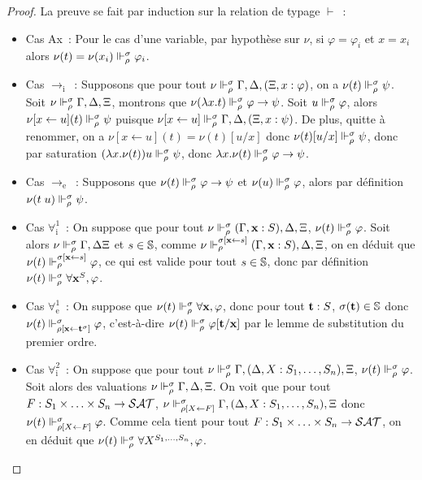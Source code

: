 \documentclass{article}
\begin{document}
\begin{proof}
  La preuve se fait par induction sur la relation de typage $\vdash$~:
  \begin{itemize}
  \item Cas Ax~: Pour le cas d'une variable, par hypothèse sur $\nu$, si $\varphi = \varphi_i$ et $x = x_i$ alors $\nu(t) = \nu(x_i)\Vdash_\rho^\sigma \varphi_i$.
  \item Cas $\to_\mathrm i$~: Supposons que pour tout $\nu \Vdash_\rho^\sigma \Gamma,\Delta,(\Xi, x : \varphi)$, on a $\nu(t) \Vdash_\rho^\sigma \psi$. Soit $\nu \Vdash_\rho^\sigma \Gamma,\Delta,\Xi$, montrons que $\nu(\lambda x.t)\Vdash_\rho^\sigma \varphi \to \psi$. Soit $u \Vdash_\rho^\sigma \varphi$, alors $\nu[x \leftarrow u](t)\Vdash_\rho^\sigma \psi$ puisque $\nu[x\leftarrow u]\Vdash_\rho^\sigma \Gamma,\Delta,(\Xi, x : \psi)$. De plus, quitte à renommer, on a $\nu[x\leftarrow u](t) = \nu(t)[u/x]$ donc $\nu(t)[u/x]\Vdash_\rho^\sigma \psi$, donc par saturation $(\lambda x.\nu(t)) u \Vdash_\rho^\sigma \psi$, donc $\lambda x.\nu(t)\Vdash_\rho^\sigma \varphi\to\psi$.
  \item Cas $\to_\mathrm e$~: Supposons que $\nu(t)\Vdash_\rho^\sigma \varphi \to \psi$ et $\nu(u)\Vdash_\rho^\sigma \varphi$, alors par définition $\nu(t\;u)\Vdash_\rho^\sigma \psi$.
  \item Cas $\forall_\mathrm i^1$~: On suppose que pour tout $\nu\Vdash_\rho^\sigma (\Gamma, \mathbf{x} : S),\Delta,\Xi$, $\nu(t)\Vdash_\rho^\sigma \varphi$. Soit alors $\nu\Vdash_\rho^\sigma \Gamma,\Delta\Xi$ et $s \in \mathbb{S}$, comme $\nu\Vdash_\rho^{\sigma[\mathbf{x}\leftarrow s]} (\Gamma,\mathbf{x} : S), \Delta,\Xi$, on en déduit que $\nu(t)\Vdash_\rho^{\sigma[\mathbf{x}\leftarrow s]} \varphi$, ce qui est valide pour tout $s\in \mathbb{S}$, donc par définition $\nu(t)\Vdash_\rho^\sigma \forall \mathbf{x}^S, \varphi$.
  \item Cas $\forall_\mathrm e^1$~: On suppose que $\nu(t)\Vdash_\rho^\sigma \forall \mathbf{x}, \varphi$, donc pour tout $\mathbf{t} : S$, $\sigma(\mathbf{t}) \in \mathbb S$ donc $\nu(t)\Vdash_{\rho[\mathbf{x}\leftarrow \mathbf{t}^\sigma]}^\sigma \varphi$, c'est-à-dire $\nu(t)\Vdash_\rho^\sigma \varphi[\mathbf{t}/\mathbf{x}]$ par le lemme de substitution du premier ordre.
  \item Cas $\forall_\mathrm i^2$~: On suppose que pour tout $\nu\Vdash_\rho^\sigma \Gamma, (\Delta, X : S_1,\ldots,S_n), \Xi$, $\nu(t) \Vdash_\rho^\sigma \varphi$. Soit alors des valuations $\nu\Vdash_\rho^\sigma\Gamma, \Delta,\Xi$. On voit que pour tout $F : S_1\times\ldots\times S_n \to \mathcal {SAT}$, $\nu\Vdash_{\rho[X\leftarrow F]}^\sigma \Gamma, (\Delta, X : S_1,\ldots,S_n),\Xi$ donc $\nu(t)\Vdash_{\rho[X\leftarrow F]}^\sigma \varphi$. Comme cela tient pour tout $F : S_1\times\ldots\times S_n \to \mathcal {SAT}$, on en déduit que $\nu(t)\Vdash_\rho^\sigma \forall X^{S_1,\ldots,S_n}, \varphi$.

\end{itemize}
\end{proof}
\end{document}
